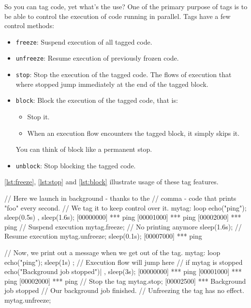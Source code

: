 So you can tag code, yet what's the use? One of the primary purpose of
tags is to be able to control the execution of code running in
parallel. Tags have a few control methods:

\begin{itemize}
\item \texttt{freeze}: Suspend execution of all tagged code.
\item \texttt{unfreeze}: Resume execution of previously frozen code.
\item \texttt{stop}: Stop the execution of the tagged code. The flows
  of execution that where stopped jump immediately at the end of the
  tagged block.
\item \texttt{block}: Block the execution of the tagged code, that is:
  \begin{itemize}
  \item Stop it.
  \item When an execution flow encounters the tagged block, it simply
    skips it.
  \end{itemize}
  You can think of block like a permanent stop.
\item \texttt{unblock}: Stop blocking the tagged code.
\end{itemize}

\autoref{lst:freeze}, \autoref{lst:stop} and \autoref{lst:block}
illustrate usage of these tag features.

\begin{urbiscript}[caption=Freezing/unfreezing code execution, label=lst:freeze]
// Here we launch in background - thanks to the
// comma - code that prints "foo" every second.
// We tag it to keep control over it.
mytag:
{
  loop
  {
    echo("ping");
    sleep(0.5s)
  }
},
sleep(1.6s);
[00000000] *** ping
[00001000] *** ping
[00002000] *** ping
// Suspend execution
mytag.freeze;
// No printing anymore
sleep(1.6s);
// Resume execution
mytag.unfreeze;
sleep(0.1s);
[00007000] *** ping
\end{urbiscript}

\begin{urbiscript}[caption=Stopping code execution, label=lst:stop]
// Now, we print out a message when we get out of the tag.
{
  mytag:
  {
    loop
    {
      echo("ping"); sleep(1s)
    }
  };
  // Execution flow will jump here
  // if mytag is stopped
  echo("Background job stopped")|
},
sleep(3s);
[00000000] *** ping
[00001000] *** ping
[00002000] *** ping
// Stop the tag
mytag.stop;
[00002500] *** Background job stopped
// Our background job finished.
// Unfreezing the tag has no effect.
mytag.unfreeze;
\end{urbiscript}

